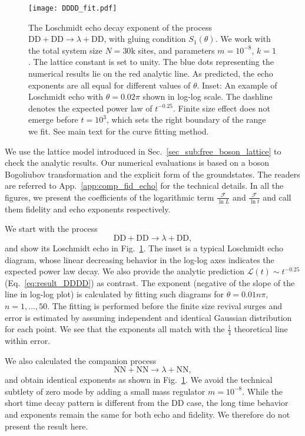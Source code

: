 \begin{figure}[h]
\texttt{[image: DDDD\_fit.pdf]}
\caption{The Loschmidt echo decay exponent of the process $\text{DD}+\text{DD}\rightarrow\lambda+\text{DD}$, with gluing condition $S_1(\theta)$. We work with the total system size $N = 30$k sites, and parameters $m = 10^{-8}$, $k = 1$. The lattice constant is set to unity. The blue dots representing the numerical results lie on the red analytic line. As predicted, the echo exponents are all equal for different values of $\theta$. Inset: An example of Loschmidt echo with $\theta = 0.02 \pi$ shown in log-log scale. The dashline denotes the expected power law of $t^{-0.25}$. Finite size effect does not emerge before $t=10^{3}$, which sets the right boundary of the range we fit. See main text for the curve fitting method.}
\label{fig:DDDD}
\end{figure}

We use the lattice model introduced in Sec.~\ref{sec_sub:free_boson_lattice} to check the analytic results. Our numerical evaluations is based on a boson Bogoliubov transformation and the explicit form of the groundstates. The readers are referred to App.~\ref{app:comp_fid_echo} for the technical details. In all the figures, we present the coefficients of the logarithmic term $\frac{\mathcal{F}}{\ln L}$ and $\frac{\mathcal{F} }{\ln t}$ and call them fidelity and echo exponents respectively. 

We start with the process
\begin{equation}
\text{DD}+\text{DD}\rightarrow\lambda+\text{DD},
\end{equation}
and show its Loschmidt echo in Fig.~\ref{fig:DDDD}. The inset is a typical Loschmidt echo diagram, whose linear decreasing behavior in the log-log axes indicates the expected power law decay. We also provide the analytic prediction $\mathcal{L}(t)\sim t^{-0.25}$ (\cf Eq.~\eqref{eq:result_DDDD}) as contrast. The exponent (negative of the slope of the line in log-log plot) is calculated by fitting such diagrams for $\theta = 0.01n \pi$, $n = 1,...,50 $. The fitting is performed before the finite size revival surges and error is estimated by assuming independent and identical Gaussian distribution for each point. We see that the exponents all match with the $\frac{1}{4}$ theoretical line within error. 

We also calculated the companion process
\begin{equation}
 \text{NN}+\text{NN}\rightarrow\lambda+\text{NN},
\end{equation}
and obtain identical exponents as shown in Fig.~\ref{fig:DDDD}. We avoid the technical subtlety of zero mode by adding a small mass regulator $m=10^{-8}$. While the short time decay pattern is different from the DD case, the long time behavior and exponents remain the same for both echo and fidelity. We therefore do not present the result here. 

